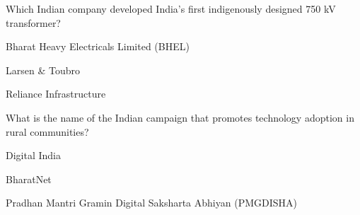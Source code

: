 \begin{enhancedmcq}{Which Indian company developed India's first indigenously designed 750 kV transformer?}
\item Bharat Heavy Electricals Limited (BHEL)
\item Larsen & Toubro
\item Reliance Infrastructure

\end{enhancedmcq}
\begin{enhancedmcq}{What is the name of the Indian campaign that promotes technology adoption in rural communities?}
\item Digital India
\item BharatNet
\item Pradhan Mantri Gramin Digital Saksharta Abhiyan (PMGDISHA)
\end{enhancedmcq}